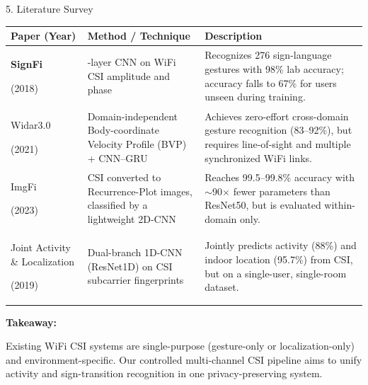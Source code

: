 \documentclass[aspectratio=169,11pt]{beamer}
\begin{document}
\begin{frame}{5. Literature Survey}

\vspace{0.1cm}
\centering
\scriptsize
\renewcommand{\arraystretch}{1.25}
\setlength{\tabcolsep}{4pt}
\begin{tabular}{>{\bfseries\RaggedRight\arraybackslash}p{} >{\RaggedRight\arraybackslash}p{} >{\RaggedRight\arraybackslash}p{}}
\toprule
\rowcolor{AmritaMaroon}
{\color{white}Paper (Year)} & {\color{white}\textbf{Method / Technique}} & {\color{white}\textbf{Description}} \\
\midrule

\rowcolor{LightBlue}
SignFi \par (2018) &
9-layer CNN on WiFi CSI amplitude and phase &
Recognizes 276 sign-language gestures with 98\% lab accuracy; accuracy falls to 67\% for users unseen during training. \\
\midrule

\rowcolor{LightGreen}
Widar3.0 \par (2021) &
Domain-independent Body-coordinate Velocity Profile (BVP) + CNN--GRU &
Achieves zero-effort cross-domain gesture recognition (83--92\%), but requires line-of-sight and multiple synchronized WiFi links. \\
\midrule

\rowcolor{LightOrange}
ImgFi \par (2023) &
CSI converted to Recurrence-Plot images, classified by a lightweight 2D-CNN &
Reaches 99.5--99.8\% accuracy with $\sim$90$\times$ fewer parameters than ResNet50, but is evaluated within-domain only. \\
\midrule

\rowcolor{LightPink}
Joint Activity \& Localization \par (2019) &
Dual-branch 1D-CNN (ResNet1D) on CSI subcarrier fingerprints &
Jointly predicts activity (88\%) and indoor location (95.7\%) from CSI, but on a single-user, single-room dataset. \\
\bottomrule
\end{tabular}

\vspace{6pt}
\raggedright
{\color{AmritaMaroon}\scriptsize\bfseries Takeaway: }{\scriptsize Existing WiFi CSI systems are single-purpose (gesture-only or localization-only) and environment-specific. Our controlled multi-channel CSI pipeline aims to unify activity and sign-transition recognition in one privacy-preserving system.\par}

\end{frame}
\end{document}
